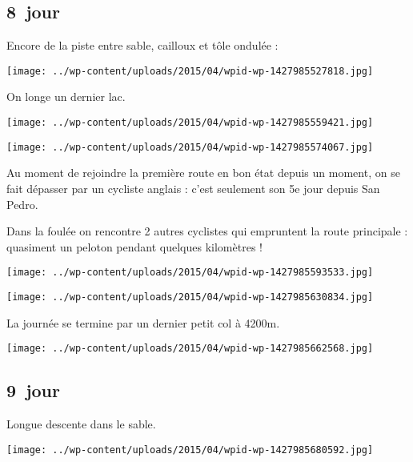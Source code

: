  \subsection*{8\ieme\ jour} 

 Encore de la piste entre sable, cailloux et tôle ondulée :
\begin{center} \texttt{[image: ../wp-content/uploads/2015/04/wpid-wp-1427985527818.jpg]} \end{center}
\vspace{-\topsep}

\pagebreak
 On longe un dernier lac.
\begin{center} \texttt{[image: ../wp-content/uploads/2015/04/wpid-wp-1427985559421.jpg]} \end{center}
\begin{center} \texttt{[image: ../wp-content/uploads/2015/04/wpid-wp-1427985574067.jpg]} \end{center}

 Au moment de rejoindre la première route en bon état depuis un moment, on se fait dépasser par un cycliste anglais : c'est seulement son 5e jour depuis San Pedro. 

\pagebreak
 Dans la foulée on rencontre 2 autres cyclistes qui empruntent la route principale : quasiment un peloton pendant quelques kilomètres !
\begin{center} \texttt{[image: ../wp-content/uploads/2015/04/wpid-wp-1427985593533.jpg]} \end{center}
\begin{center} \texttt{[image: ../wp-content/uploads/2015/04/wpid-wp-1427985630834.jpg]} \end{center}
\vspace{-\topsep}
\vspace{-3mm}

\pagebreak
 La journée se termine par un dernier petit col à 4200m.
\begin{center} \texttt{[image: ../wp-content/uploads/2015/04/wpid-wp-1427985662568.jpg]} \end{center}

 \subsection*{9\ieme\ jour} 

 Longue descente dans le sable.
\begin{center} \texttt{[image: ../wp-content/uploads/2015/04/wpid-wp-1427985680592.jpg]} \end{center}
\vspace{-\topsep}

